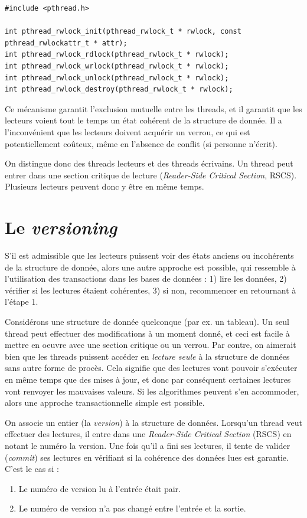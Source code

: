 \begin{verbatim}
#include <pthread.h>
  
int pthread_rwlock_init(pthread_rwlock_t * rwlock, const pthread_rwlockattr_t * attr);
int pthread_rwlock_rdlock(pthread_rwlock_t * rwlock);
int pthread_rwlock_wrlock(pthread_rwlock_t * rwlock);
int pthread_rwlock_unlock(pthread_rwlock_t * rwlock);
int pthread_rwlock_destroy(pthread_rwlock_t * rwlock);
\end{verbatim}

Ce mécanisme garantit l'exclusion mutuelle entre les threads, et il garantit que
les lecteurs voient tout le temps un état cohérent de la structure de donnée.
Il a l'inconvénient que les lecteurs doivent acquérir un verrou, ce qui est
potentiellement coûteux, même en l'absence de conflit (si personne n'écrit).

On distingue donc des threads \og lecteurs\fg{} et des threads \og
écrivains\fg{}. Un thread peut entrer dans une section critique de lecture
(\emph{Reader-Side Critical Section}, RSCS). Plusieurs lecteurs peuvent donc y
être en même temps.

\section{Le \emph{versioning}}

S'il est admissible que les lecteurs puissent voir des états anciens ou
incohérents de la structure de donnée, alors une autre approche est possible,
qui ressemble à l'utilisation des transactions dans les bases de données : 1)
lire les données, 2) vérifier si les lectures étaient cohérentes, 3) si non,
recommencer en retournant à l'étape 1.

Considérons une structure de donnée quelconque (par ex. un tableau). Un seul
thread peut effectuer des modifications à un moment donné, et ceci est facile à
mettre en oeuvre avec une section critique ou un verrou. Par contre, on aimerait
bien que les threads puissent accéder en \emph{lecture seule} à la structure de
données sans autre forme de procès. Cela signifie que des lectures vont pouvoir
s'exécuter en même temps que des mises à jour, et donc par conséquent certaines
lectures vont renvoyer les mauvaises valeurs. Si les algorithmes peuvent s'en
accommoder, alors une approche \og transactionnelle\fg{} simple est possible.

On associe un entier (la \emph{version}) à la structure de données. Lorsqu'un
thread veut effectuer des lectures, il entre dans une \emph{Reader-Side Critical
  Section} (RSCS) en notant le numéro la version. Une fois qu'il a fini ses lectures,
il tente de valider (\og \emph{commit}\fg{}) ses lectures en vérifiant si la
cohérence des données lues est garantie. C'est le cas si :
\begin{enumerate}[$i$)]
\item Le numéro de version lu à l'entrée était pair.
\item Le numéro de version n'a pas changé entre l'entrée et la sortie.
\end{enumerate}
\medskip


